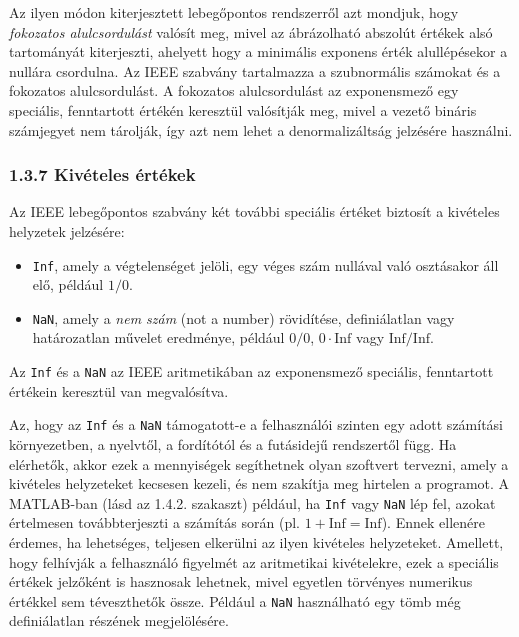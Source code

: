 \documentclass[
  magyar,
  11pt]{article}
\providecommand{\tightlist}{%
  \setlength{\itemsep}{0pt}\setlength{\parskip}{0pt}}
\begin{document}
Az ilyen módon kiterjesztett lebegőpontos rendszerről azt mondjuk, hogy
\emph{fokozatos alulcsordulást} valósít meg, mivel az ábrázolható
abszolút értékek alsó tartományát kiterjeszti, ahelyett hogy a minimális
exponens érték alullépésekor a nullára csordulna. Az IEEE szabvány
tartalmazza a szubnormális számokat és a fokozatos alulcsordulást. A
fokozatos alulcsordulást az exponensmező egy speciális, fenntartott
értékén keresztül valósítják meg, mivel a vezető bináris számjegyet nem
tárolják, így azt nem lehet a denormalizáltság jelzésére használni.

\subsubsection{1.3.7 Kivételes
értékek}\label{kivuxe9teles-uxe9rtuxe9kek}

Az IEEE lebegőpontos szabvány két további speciális értéket biztosít a
kivételes helyzetek jelzésére:

\begin{itemize}
\tightlist
\item
  \texttt{Inf}, amely a végtelenséget jelöli, egy véges szám nullával
  való osztásakor áll elő, például \(1/0\).
\item
  \texttt{NaN}, amely a \emph{nem szám} (not a number) rövidítése,
  definiálatlan vagy határozatlan művelet eredménye, például \(0/0\),
  \(0 \cdot \text{Inf}\) vagy \(\text{Inf}/\text{Inf}\).
\end{itemize}

Az \texttt{Inf} és a \texttt{NaN} az IEEE aritmetikában az exponensmező
speciális, fenntartott értékein keresztül van megvalósítva.

Az, hogy az \texttt{Inf} és a \texttt{NaN} támogatott-e a felhasználói
szinten egy adott számítási környezetben, a nyelvtől, a fordítótól és a
futásidejű rendszertől függ. Ha elérhetők, akkor ezek a mennyiségek
segíthetnek olyan szoftvert tervezni, amely a kivételes helyzeteket
kecsesen kezeli, és nem szakítja meg hirtelen a programot. A MATLAB-ban
(lásd az 1.4.2. szakaszt) például, ha \texttt{Inf} vagy \texttt{NaN} lép
fel, azokat értelmesen továbbterjeszti a számítás során (pl.
\(1 + \text{Inf} = \text{Inf}\)). Ennek ellenére érdemes, ha lehetséges,
teljesen elkerülni az ilyen kivételes helyzeteket. Amellett, hogy
felhívják a felhasználó figyelmét az aritmetikai kivételekre, ezek a
speciális értékek jelzőként is hasznosak lehetnek, mivel egyetlen
törvényes numerikus értékkel sem téveszthetők össze. Például a
\texttt{NaN} használható egy tömb még definiálatlan részének
megjelölésére.
\end{document}
